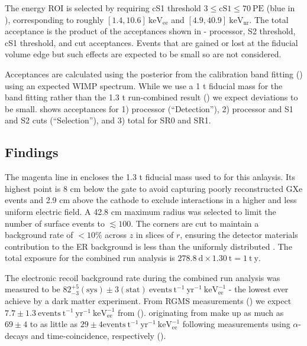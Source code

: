 The energy ROI is selected by requiring cS1 threshold $3 \leq \mathrm{cS1} \leq 70\ \mathrm{PE}$ (blue in
), corresponding to roughly
$[1.4, 10.6]\ \mathrm{keV_{ee}}$ and $[4.9, 40.9]\ \mathrm{keV_{nr}}$.  The total acceptance is the product of the acceptances shown
in  - processor, S2 threshold, cS1 threshold, and
cut acceptances.  Events that are gained or lost at the fiducial volume edge but such effects are
expected to be small so are not considered.

Acceptances are calculated using the posterior from the calibration band fitting () using an expected
WIMP spectrum.  While we use a 1 t fiducial mass for the band fitting rather than the 1.3 t run-combined
result () we expect deviations to be
small.   shows acceptances for 1) processor (``Detection''), 2) processor and S1 and
S2 cuts (``Selection''), and 3) total for SR0 and SR1.



\subsection{Findings}
\label{subsec:dark_matter_results_background}
The magenta line in  encloses the 1.3 t fiducial mass used to for this anlaysis.  Its highest
point is 8 cm below the gate to avoid capturing poorly reconstructed GXe events and 2.9 cm above the cathode to
exclude interactions in a higher and less uniform electric field.  A 42.8 cm maximum radius was selected to limit the number of surface
events to $\lesssim 100$.  The corners are cut to maintain a background rate of $< 10\%$ across
$z$ in slices of $r$, ensuring the detector materials contribution to the ER background is less than the uniformly distributed
.  The total exposure for the combined run analysis is $278.8\ \mathrm{d} \times 1.30\ \mathrm{t} = 1\ \mathrm{t\ y}$.

The electronic recoil background rate during the combined run analysis was measured to be
$82_{-3}^{+5} (\mathrm{sys}) \pm 3 (\mathrm{stat})\ \mathrm{events\ t^{-1}\ yr^{-1}\ keV_{ee}^{-1}}$ - the lowest ever achieve by a dark
matter experiment.  From RGMS measurements () we expect
$7.7 \pm 1.3\ \mathrm{events\ t^{-1}\ yr^{-1}\ keV_{ee}^{-1}}$ from  
().  \betadecays originating from  make up as much as $69 \pm 4$ to as
little as $29 \pm 4  \mathrm{events\ t^{-1}\ yr^{-1}\ keV_{ee}^{-1}}$ following measurements using  $\alpha$-decays and
 time-coincidence, respectively ().

